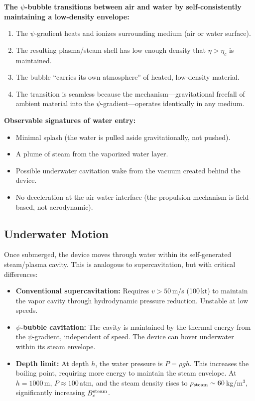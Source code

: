 \documentclass[11pt]{article}
\newcommand{\etac}{\eta_c}
\begin{document}
\begin{tcolorbox}[colback=cyan!5,colframe=cyan!50!black,title=Trans-Medium Prediction]
\textbf{The $\psi$-bubble transitions between air and water by
self-consistently maintaining a low-density envelope:}
\begin{enumerate}[noitemsep]
\item The $\psi$-gradient heats and ionizes surrounding medium
  (air or water surface).
\item The resulting plasma/steam shell has low enough density that
  $\eta > \etac$ is maintained.
\item The bubble ``carries its own atmosphere'' of heated,
  low-density material.
\item The transition is seamless because the mechanism---gravitational
  freefall of ambient material into the $\psi$-gradient---operates
  identically in any medium.
\end{enumerate}

\textbf{Observable signatures of water entry:}
\begin{itemize}[noitemsep]
\item Minimal splash (the water is pulled aside gravitationally,
  not pushed).
\item A plume of steam from the vaporized water layer.
\item Possible underwater cavitation wake from the vacuum created
  behind the device.
\item No deceleration at the air-water interface (the propulsion
  mechanism is field-based, not aerodynamic).
\end{itemize}
\end{tcolorbox}

\subsection{Underwater Motion}

Once submerged, the device moves through water within its self-generated
steam/plasma cavity. This is analogous to supercavitation, but with
critical differences:

\begin{itemize}
\item \textbf{Conventional supercavitation:} Requires $v > 50$\,m/s
  (100\,kt) to maintain the vapor cavity through hydrodynamic
  pressure reduction. Unstable at low speeds.

\item \textbf{$\psi$-bubble cavitation:} The cavity is maintained by
  the thermal energy from the $\psi$-gradient, independent of speed.
  The device can hover underwater within its steam envelope.

\item \textbf{Depth limit:} At depth $h$, the water pressure is
  $P = \rho g h$. This increases the boiling point, requiring more
  energy to maintain the steam envelope. At $h = 1000$\,m,
  $P \approx 100$\,atm, and the steam density rises to
  $\rho_{\rm steam} \sim 60$\,kg/m$^3$, significantly increasing
  $B_c^{\rm steam}$.
\end{itemize}
\end{document}
